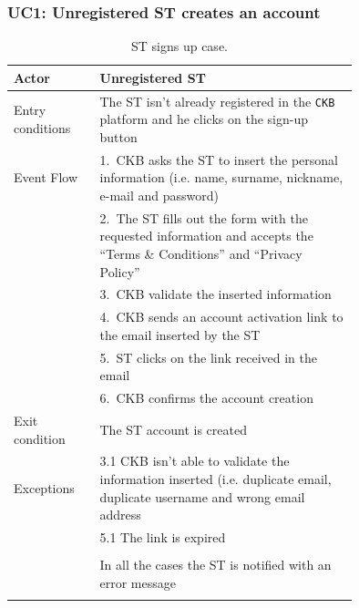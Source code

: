 \subsubsection*{UC1: Unregistered ST creates an account}
\begin{center}
  \begin{longtable}{l|p{0.75\linewidth}}
    \hline
    Actor & Unregistered ST \\
    \hline
    Entry conditions & The ST isn’t already registered in the \verb|CKB| platform and he clicks on the sign-up button \\
    \hline
    Event Flow & 1.\ CKB asks the ST to insert the personal information (i.e. name, surname, nickname, e-mail and password) \\
    & 2.\ The ST fills out the form with the requested information and accepts the “Terms \& Conditions” and “Privacy Policy” \\
    & 3.\ CKB validate the inserted information \\
    & 4.\ CKB sends an account activation link to the email inserted by the ST \\
    & 5.\ ST clicks on the link received in the email \\
    & 6.\ CKB confirms the account creation  \\
    \hline
    Exit condition & The ST account is created \\
    \hline
    Exceptions & 3.1 CKB isn’t able to validate the information inserted (i.e. duplicate email, duplicate username and wrong email address \\
    & 5.1 The link is expired \\ \\
    & In all the cases the ST is notified with an error message\\
    \hline
    \caption{ST signs up case.}
    \label{tab: ST_signs_up}
  \end{longtable}


\end{center}
